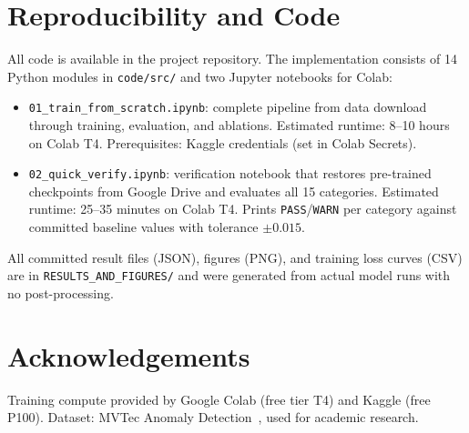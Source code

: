 \documentclass[11pt,letterpaper]{article}
\begin{document}
\section{Reproducibility and Code}

All code is available in the project repository. The implementation consists of 14
Python modules in \texttt{code/src/} and two Jupyter notebooks for Colab:

\begin{itemize}[leftmargin=*,itemsep=2pt]
  \item \texttt{01\_train\_from\_scratch.ipynb}: complete pipeline from data download
        through training, evaluation, and ablations. Estimated runtime: 8--10 hours on
        Colab T4. Prerequisites: Kaggle credentials (set in Colab Secrets).
  \item \texttt{02\_quick\_verify.ipynb}: verification notebook that restores pre-trained
        checkpoints from Google Drive and evaluates all 15 categories. Estimated runtime:
        25--35 minutes on Colab T4. Prints \texttt{PASS}/\texttt{WARN} per category
        against committed baseline values with tolerance $\pm0.015$.
\end{itemize}

All committed result files (JSON), figures (PNG), and training loss curves (CSV) are
in \texttt{RESULTS\_AND\_FIGURES/} and were generated from actual model runs with no
post-processing.

\section*{Acknowledgements}

Training compute provided by Google Colab (free tier T4) and Kaggle (free P100).
Dataset: MVTec Anomaly Detection~\cite{mvtec2019}, used for academic research.
\end{document}
